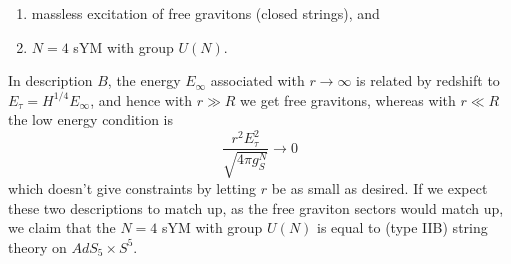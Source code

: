 \documentclass{article}
\begin{document}
\begin{enumerate}
	\item massless excitation of free gravitons (closed strings), and 
	\item $N=4$ sYM with group $U(N)$. 
\end{enumerate}
In description $B$, the energy $E_\infty$ associated with $r \to \infty$ is related by redshift to $E_\tau = H^{1/4} E_\infty$, and hence with $r \gg R$ we get free gravitons, whereas with $r \ll R$ the low energy condition is 
\[
\frac{r^2 E_\tau^2}{\sqrt{4 \pi g_S^N}} \to 0
\] 
which doesn't give constraints by letting $r$ be as small as desired. If we expect these two descriptions to match up, as the free graviton sectors would match up, we claim that the $N=4$ sYM with group $U(N)$ is equal to (type IIB) string theory on $AdS_5 \times S^5$. 


\end{document}
